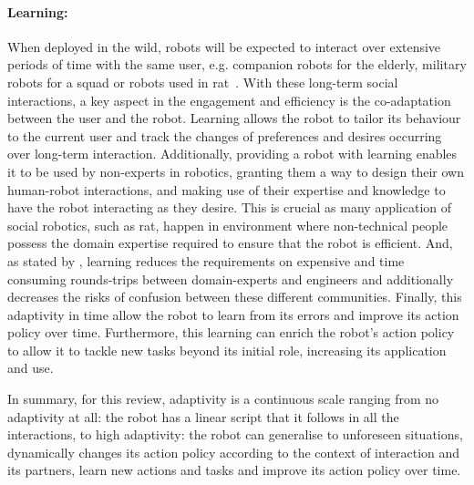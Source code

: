 	\paragraph{Learning:} When deployed in the wild, robots will be expected to interact over extensive periods of time with the same user, e.g. companion robots for the elderly, military robots for a squad or robots used in \gls{rat}~\citep{leite2013social}. With these long-term social interactions, a key aspect in the engagement and efficiency is the co-adaptation between the user and the robot. Learning allows the robot to tailor its behaviour to the current user and track the changes of preferences and desires occurring over long-term interaction. Additionally, providing a robot with learning enables it to be used by non-experts in robotics, granting them a way to design their own human-robot interactions, and making use of their expertise and knowledge to have the robot interacting as they desire. This is crucial as many application of social robotics, such as \gls{rat}, happen in environment where non-technical people possess the domain expertise required to ensure that the robot is efficient. And, as stated by \cite{amershi2014power}, learning reduces the requirements on expensive and time consuming rounds-trips between domain-experts and engineers and additionally decreases the risks of confusion between these different communities. Finally, this adaptivity in time allow the robot to learn from its errors and improve its action policy over time. Furthermore, this learning can enrich the robot's action policy to allow it to tackle new tasks beyond its initial role, increasing its application and use.
	
    In summary, for this review, adaptivity is a continuous scale ranging from no adaptivity at all: the robot has a linear script that it follows in all the interactions, to high adaptivity: the robot can generalise to unforeseen situations, dynamically changes its action policy according to the context of interaction and its partners, learn new actions and tasks and improve its action policy over time. 

